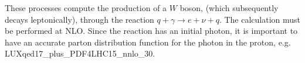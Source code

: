 \label{subsec:wbosonphoton}

These processes compute the production of
a $W$ boson, (which subsequently decays leptonically),
through the reaction $q + \gamma \to e + \nu + q$.
The calculation must be performed at NLO.
Since the reaction has an initial
photon, it is important to have an accurate parton distribution function for
the photon in the proton, e.g. LUXqed17\_plus\_PDF4LHC15\_nnlo\_30.
